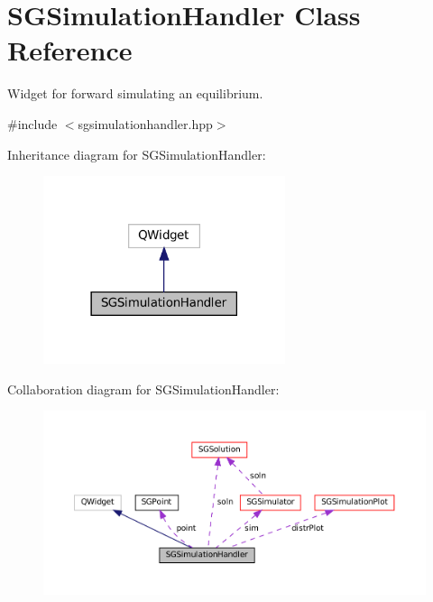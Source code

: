 \hypertarget{classSGSimulationHandler}{}\section{S\+G\+Simulation\+Handler Class Reference}
\label{classSGSimulationHandler}


Widget for forward simulating an equilibrium.  




{\ttfamily \#include $<$sgsimulationhandler.\+hpp$>$}



Inheritance diagram for S\+G\+Simulation\+Handler\+:
\nopagebreak
\begin{figure}[H]
\begin{center}
\leavevmode
\includegraphics[width=201pt]{classSGSimulationHandler__inherit__graph}
\end{center}
\end{figure}


Collaboration diagram for S\+G\+Simulation\+Handler\+:
\nopagebreak
\begin{figure}[H]
\begin{center}
\leavevmode
\includegraphics[width=350pt]{classSGSimulationHandler__coll__graph}
\end{center}
\end{figure}
